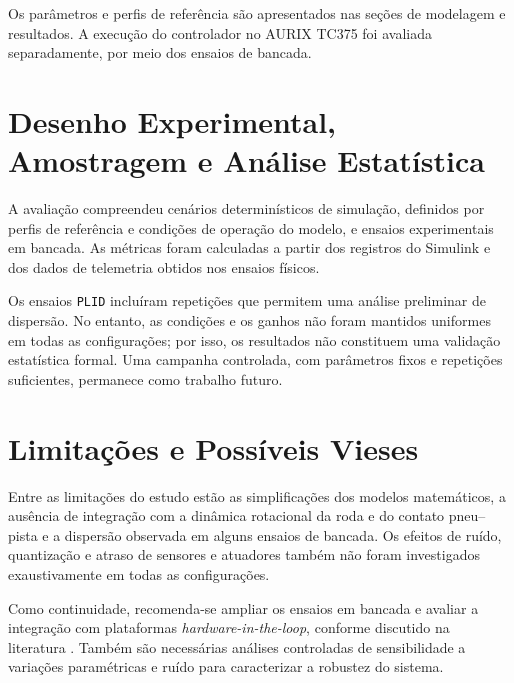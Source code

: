 Os parâmetros e perfis de referência são apresentados nas seções de modelagem e resultados. A execução do controlador no AURIX TC375 foi avaliada separadamente, por meio dos ensaios de bancada.

\section{Desenho Experimental, Amostragem e Análise Estatística}
\label{sec:metodologia-11}
A avaliação compreendeu cenários determinísticos de simulação, definidos por perfis de referência e condições de operação do modelo, e ensaios experimentais em bancada. As métricas foram calculadas a partir dos registros do Simulink e dos dados de telemetria obtidos nos ensaios físicos.

Os ensaios \texttt{PLID} incluíram repetições que permitem uma análise preliminar de dispersão. No entanto, as condições e os ganhos não foram mantidos uniformes em todas as configurações; por isso, os resultados não constituem uma validação estatística formal. Uma campanha controlada, com parâmetros fixos e repetições suficientes, permanece como trabalho futuro.

\section{Limitações e Possíveis Vieses}
\label{sec:metodologia-12}
Entre as limitações do estudo estão as simplificações dos modelos matemáticos, a ausência de integração com a dinâmica rotacional da roda e do contato pneu--pista e a dispersão observada em alguns ensaios de bancada. Os efeitos de ruído, quantização e atraso de sensores e atuadores também não foram investigados exaustivamente em todas as configurações.

Como continuidade, recomenda-se ampliar os ensaios em bancada e avaliar a integração com plataformas \textit{hardware-in-the-loop}, conforme discutido na literatura . Também são necessárias análises controladas de sensibilidade a variações paramétricas e ruído para caracterizar a robustez do sistema.